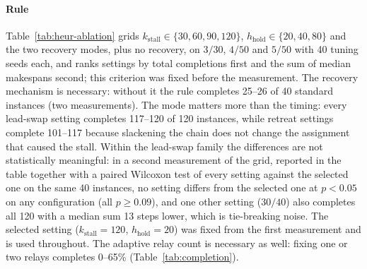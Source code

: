 \documentclass[final,5p,times,twocolumn]{elsarticle}
\begin{document}
\paragraph{Rule}
\label{sec:rq5-rule}
Table~\ref{tab:heur-ablation} grids $k_{\mathrm{stall}} \in \{30,60,90,120\}$,
$h_{\mathrm{hold}} \in \{20,40,80\}$ and the two recovery modes, plus no recovery, on $3/30$,
$4/50$ and $5/50$ with 40 tuning seeds each, and ranks settings by total completions first and
the sum of median makespans second; this criterion was fixed before the measurement. The recovery
mechanism is necessary: without it the rule completes 25--26 of 40 standard instances (two
measurements). The mode matters more than the timing: every lead-swap setting completes 117--120
of 120 instances, while retreat settings complete 101--117 because slackening the chain does not
change the assignment that caused the stall. Within the lead-swap family the differences are not
statistically meaningful: in a second measurement of the grid, reported in the table together with
a paired Wilcoxon test of every setting against the selected one on the same 40 instances, no
setting differs from the selected one at $p<0.05$ on any configuration (all $p \ge 0.09$), and
one other setting ($30/40$) also completes all 120 with a median sum 13 steps lower, which is
tie-breaking noise. The selected setting ($k_{\mathrm{stall}}=120$, $h_{\mathrm{hold}}=20$)
was fixed from the first measurement and is used throughout. The adaptive relay count is necessary as well: fixing one or two
relays completes 0--65\% (Table~\ref{tab:completion}).

\begin{table}[t]
\centering
\caption{Rule ablation on tuning seeds disjoint from the evaluation seeds (40 instances per
configuration). Cells give completed instances, the median makespan over completed instances and,
in parentheses, the $p$-value of a Wilcoxon signed-rank test of that setting against the selected
setting (bold) on the instances both completed; the last column sums completions over the three
configurations.}
\label{tab:heur-ablation}
\small

\end{table}
\end{document}
